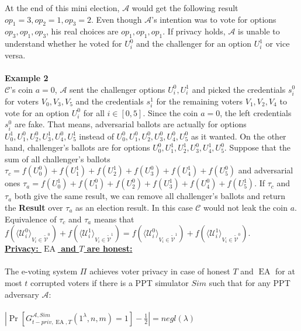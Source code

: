 \documentclass[12pt]{article}
\DeclareMathOperator{\ea}{EA}
\begin{document}
At the end of this mini election,  $\mathcal{A}$ would get the following result $op_1 = 3, op_2 = 1, op_3 = 2$. Even though  $\mathcal{A}$'s intention was  to vote for options $op_3,op_1,op_3$, his real choices are $op_1,op_1,op_1$. If privacy holds, $\mathcal{A}$  is unable to understand whether he voted for $U_i^0$ and the challenger for an option $U_i^1$ or vice versa. \\\\
\textbf{Example 2}\\
$\mathcal{C}$'s coin $a=0$, $\mathcal{A}$ sent the challenger options $U_i^0,U_i^1$ and picked the credentials $s_i^0$ for voters $V_0,V_3,V_5$ and the credentials $s_i^1$ for the remaining voters $V_1,V_2,V_4$ to vote for an option $U_i^0$ for all $i \in [0,5]$. Since the coin $a=0$, the left credentials $s_i^0$ are fake. That means, adversarial ballots are actually for options $U_0^1,U_1^0,U_2^0,U_3^1,U_4^0,U_5^1$ instead of $U_0^0,U_1^0,U_2^0,U_3^0,U_4^0,U_5^0$ as it wanted. On the other hand, challenger's ballots are for options $U_0^0,U_1^1,U_2^1,U_3^0,U_4^1,U_5^0$. Suppose that  the sum of all challenger's ballots  $\tau_c = f(U_0^0) + f(U_1^1) + f(U_2^1) + f(U_3^0) + f(U_4^1) + f(U_5^0)$ and adversarial ones $\tau_a =  f(U_0^1) + f(U_1^0) + f(U_2^0) + f(U_3^1) + f(U_4^0) + f(U_5^1)$. If $\tau_c$ and $\tau_a$ both give the same result, we can remove all challenger's ballots and return the \textbf{Result} over $\tau_a$ as an election result. In this case $\mathcal{C}$ would not leak the coin $a$. Equivalence of $\tau_c$ and $\tau_a$ means that $f(\langle \mathcal{U}^0_i \rangle _{V_i \in \tilde{\mathcal{V}}^0} ) + f(\langle \mathcal{U}^1_i \rangle _{V_i \in \tilde{\mathcal{V}}^1} ) =  f(\langle \mathcal{U}^0_i \rangle _{V_i \in \tilde{\mathcal{V}}^1} ) +  f(\langle \mathcal{U}^1_i \rangle _{V_i \in \tilde{\mathcal{V}}^0} )$.\\

 
\underline{\textbf{Privacy: $\ea$ and $T$ are honest:}}\\\\
The e-voting system $\Pi$ achieves voter privacy in case of honest $T$ and $\ea$  for at most $t$ corrupted voters if there is a PPT simulator $Sim$ such that for any PPT adversary $\mathcal{A}$:\\\\
 $|\Pr[G_{t-priv,\ea,T}^{\mathcal{A}, Sim}(1^{\lambda},n,m) = 1] - \frac{1}{2}| = negl(\lambda)$
\end{document}
